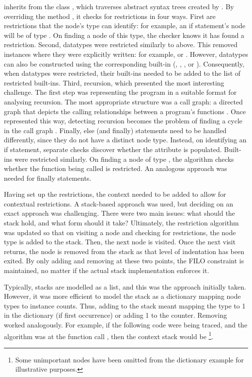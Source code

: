  inherits from the class , which traverses abstract syntax trees created by . By overriding the method , it checks for restrictions in four ways. First are restrictions that the node's type can identify: for example, an if statement's node will be of type . On finding a node of this type, the checker knows it has found a restriction.
Second, datatypes were restricted similarly to above. This removed instances where they were explicitly written: for example,  or . However, datatypes can also be constructed using the corresponding built-in (, , , or ). Consequently, when datatypes were restricted, their built-ins needed to be added to the list of restricted built-ins. Third, recursion, which presented the most interesting challenge.
The first step was representing the program in a suitable format for analysing recursion. The most appropriate structure was a call graph: a directed graph that depicts the calling relationships between a program's functions \cite{grove_call_1997}. Once represented this way, detecting recursion becomes the problem of finding a cycle in the call graph \cite{rinderknecht_survey_2014}.
Finally, else (and finally) statements need to be handled differently, since they do not have a distinct node type. Instead, on identifying an if statement, separate checks discover whether the  attribute is populated. Built-ins were restricted similarly. On finding a node of type , the algorithm checks whether the function being called is restricted. An analogous approach was needed for finally statements.

Having set up the restrictions, the context needed to be added to allow for contextual restrictions. A stack-based approach was used, but deciding on an exact approach was challenging. There were two main issues: what should the stack hold, and what form should it take? Ultimately, the restriction algorithm was updated so that on visiting a node and checking for restrictions, the node type is added to the stack. Then, the next node is visited. Once the next visit returns, the node is removed from the stack as that level of indentation has been exited. By only adding and removing at these two points, the FILO constraint is maintained, no matter if the actual stack implementation enforces it.

Typically, stacks are modelled as a list, and this was the approach initially taken. However, it was more efficient to model the stack as a dictionary mapping node types to instance counts. Thus, adding to the stack meant mapping the type to 1 in the dictionary (if first occurrence) or adding 1 to the counter. Removing worked analogously. For example, if the following code were being traced, and the algorithm was at the function call , then the context stack would be \footnote{Some unimportant nodes have been omitted from the dictionary example for illustrative purposes.}.

